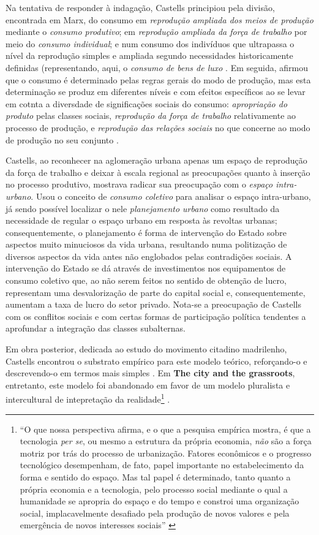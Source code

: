 Na tentativa de responder à indagação, Castells principiou pela divisão, encontrada em Marx, do consumo em \textit{reprodução ampliada dos meios de produção} mediante o \textit{consumo produtivo}; em \textit{reprodução ampliada da força de trabalho} por meio do \textit{consumo individual}; e num consumo dos indivíduos que ultrapassa o nível da reprodução simples e ampliada segundo  necessidades historicamente definidas (representando, aqui, o \textit{consumo de bens de luxo} \cite[p.~568]{CASTELLS2000}. Em seguida, afirmou que o consumo é determinado pelas regras gerais do modo de produção, mas esta determinação se produz em diferentes níveis e com efeitos específicos ao se levar em cotnta a diversdade de significações sociais do consumo: \textit{apropriação do produto} pelas classes sociais, \textit{reprodução da força de trabalho} relativamente ao processo de produção, e \textit{reprodução das relações sociais} no que concerne ao modo de produção no seu conjunto \cite[p.~569]{CASTELLS2000}. 

Castells, ao reconhecer na aglomeração urbana apenas um espaço de reprodução da força de trabalho e deixar à escala regional as preocupações quanto à inserção no processo produtivo, mostrava radicar sua preocupação com o \textit{espaço intra-urbano}. Usou o conceito de \textit{consumo coletivo} para analisar o espaço intra-urbano, já sendo possível localizar o nele \textit{planejamento urbano} como resultado da necessidade de regular o espaço urbano em resposta às revoltas urbanas; consequentemente, o planejamento é forma de intervenção do Estado sobre aspectos muito minuciosos da vida urbana, resultando numa politização de diversos aspectos da vida antes não englobados pelas contradições sociais. A intervenção do Estado se dá através de investimentos nos equipamentos de consumo coletivo que, ao não serem feitos no sentido de obtenção de lucro, representam uma desvalorização de parte do capital social e, consequentemente, aumentam a taxa de lucro do setor privado. Nota-se a preocupação de Castells com os conflitos sociais e com certas formas de participação política tendentes a aprofundar a integração das classes subalternas.

Em obra posterior, dedicada ao estudo do movimento citadino madrilenho, Castells encontrou o substrato empírico para este modelo teórico, reforçando-o e descrevendo-o em termos mais simples \cite[p.~20-25]{CASTELLS1980}. Em \textbf{The city and the grassroots}, entretanto, este modelo foi abandonado em favor de um modelo pluralista e intercultural de intepretação da realidade\footnote{``O que nossa perspectiva afirma, e o que a pesquisa empírica mostra, é que a tecnologia \textit{per se}, ou mesmo a estrutura da própria economia, \textit{não} são a força motriz  por trás do processo de urbanização. Fatores econômicos e o progresso tecnológico desempenham, de fato, papel importante no estabelecimento da forma e sentido do espaço. Mas tal papel é determinado, tanto quanto a própria economia e a tecnologia, pelo processo social mediante o qual a humanidade se apropria do espaço e do tempo e constroi uma organização social, implacavelmente desafiado pela produção de novos valores e pela emergência de novos interesses sociais'' \cite[p.~291]{CASTELLS1983}} \cite{CASTELLS1983}.

